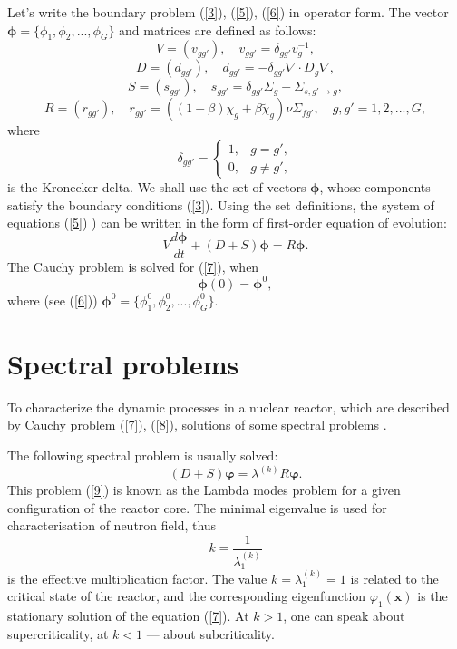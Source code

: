 \documentclass[authoryear]{elsarticle}
\begin{document}
Let’s write the boundary problem (\ref{3}), (\ref{5}), (\ref{6}) in operator form. The vector $\bm \phi = \{\phi_1, \phi_2, ..., \phi_G\}$ and matrices are defined as follows:
\[
 V = (v_{g g'}),
 \quad v_{g g'} = \delta_{g g'} v_g^{-1},
\] 
\[
 D = (d_{g g'}),
 \quad d_{g g'} = - \delta_{g g'} \nabla \cdot D_g \nabla,
\] 
\[
 S = (s_{g g'}),
 \quad  s_{g g'} =  \delta_{g g'} \Sigma_g - \Sigma_{s,g'\rightarrow g} ,
\] 
\[
 R = (r_{g g'}),
 \quad  r_{g g'} = ( (1-\beta) \chi_g + \beta \widetilde{\chi}_g) \nu \Sigma_{fg'} ,
 \quad g, g' = 1,2, ..., G,
\] 
where
\[
 \delta_{g g'} = \left \{ 
 \begin{matrix}
 1, & g = g', \\
 0, & g \neq  g',
 \end{matrix}
 \right . 
\] 
is the Kronecker delta.
We shall use the set of vectors $\bm \phi$, whose components satisfy the boundary conditions (\ref{3}). Using the set definitions, the system of equations (\ref{5}) ) can be written in the form of first-order equation of evolution:
\begin{equation}\label{7}
 V \frac{d \bm \phi}{d t} + (D+S) \bm \phi = R \bm \phi .
\end{equation}  
The Cauchy problem is solved for (\ref{7}), when
\begin{equation}\label{8}
 \bm \phi(0) = \bm \phi^0,
\end{equation} 
where (see (\ref{6})) $\bm \phi^0 = \{ \phi_1^0,  \phi_2^0, ...,  \phi_G^0 \}$.

\section{Spectral problems} 

To characterize the dynamic processes in a nuclear reactor, which are described by Cauchy problem (\ref{7}), (\ref{8}), solutions of some spectral problems  \cite{Bell1970,hetrick1971dynamics,stacey}.

The following spectral problem is usually solved:
\begin{equation}\label{9}
 (D+S) \bm \varphi  = \lambda^{(k)} R \bm \varphi .
\end{equation} 
This problem (\ref{9}) is known as the Lambda modes problem for a given configuration of the reactor core.
The minimal eigenvalue is used for characterisation of neutron field, thus 
\[
 k = \frac{1}{\lambda^{(k)}_1}  
\] 
is the effective multiplication factor.
The value $k = \lambda^{(k)}_1 = 1$ is related to the critical state of the reactor, and the corresponding eigenfunction $\varphi_1(\bm x)$ is the stationary solution of the equation (\ref{7}).
At $k > 1$, one can speak about supercriticality, at $k < 1$  --- about subcriticality.
\end{document}
